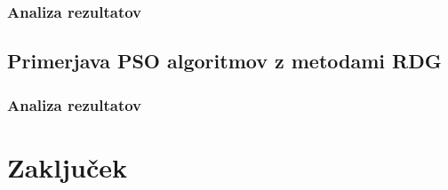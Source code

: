 
\subsection{Analiza rezultatov}


\section{Primerjava PSO algoritmov z metodami RDG}


\subsection{Analiza rezultatov}


\chapter{Zaključek}\label{chap:end}

